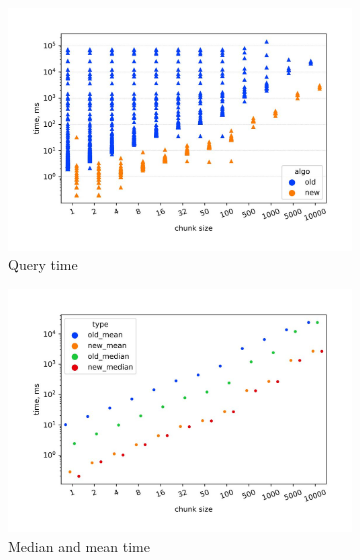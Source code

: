 \begin{figure}[h!]
    \begin{subfigure}[b]{0.5\textwidth}
    \centering
    \includegraphics[width=\textwidth]{figures/subclass_old_new.pdf_1.jpg} \caption{Query time}
    \label{fig:subim1}
    \end{subfigure}%
    \begin{subfigure}[b]{0.5\textwidth}
    \centering
    \includegraphics[width=\columnwidth]{figures/subclass_old_new_mean&median.pdf_1.jpg} \caption{Median and mean time}
    \label{fig:subim2}
    \end{subfigure} \caption{Grammar $G_2$ and Enzyme}
    \label{old_new2}
        \begin{subfigure}[b]{0.5\textwidth}
    \centering

\end{subfigure}
\end{figure}
